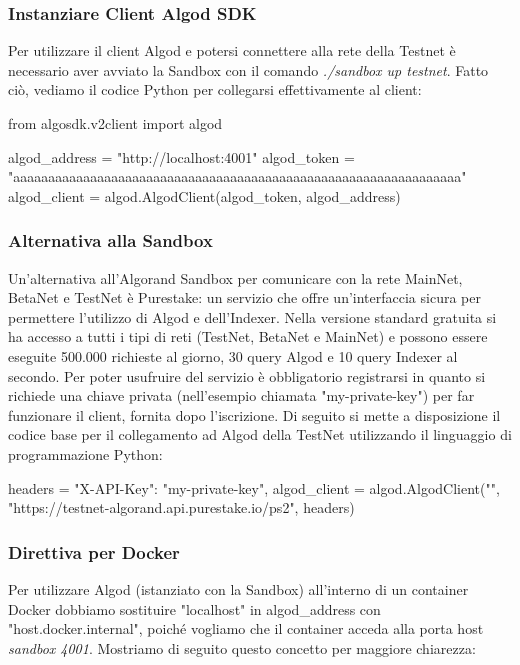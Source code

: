 \subsubsection{Instanziare Client Algod SDK}
Per utilizzare il client Algod e potersi connettere alla rete della Testnet è necessario aver avviato la Sandbox con il comando \textit{./sandbox up testnet}.
Fatto ciò, vediamo il codice Python per collegarsi effettivamente al client:
\begin{pythoncode}
from algosdk.v2client import algod

algod_address = "http://localhost:4001"
algod_token = 
"aaaaaaaaaaaaaaaaaaaaaaaaaaaaaaaaaaaaaaaaaaaaaaaaaaaaaaaaaaaaaaaa"
algod_client = algod.AlgodClient(algod_token, algod_address)
\end{pythoncode}

\subsubsection{Alternativa alla Sandbox}
Un'alternativa all'Algorand Sandbox per comunicare con la rete MainNet, BetaNet e TestNet è Purestake: un servizio che offre un’interfaccia sicura per permettere l'utilizzo di Algod e dell’Indexer. Nella versione standard gratuita si ha accesso a tutti i tipi di reti (TestNet, BetaNet e MainNet) e possono essere eseguite 500.000 richieste al giorno, 30 query Algod e 10 query Indexer al secondo. Per poter usufruire del servizio è obbligatorio registrarsi in quanto si richiede una chiave privata (nell'esempio chiamata "my-private-key") per far funzionare il client, fornita dopo l'iscrizione. Di seguito si mette a disposizione il codice base per il collegamento ad Algod della TestNet utilizzando il linguaggio di programmazione Python:
\begin{pythoncode}
headers = {
"X-API-Key": "my-private-key",
}
algod_client = algod.AlgodClient("",
"https://testnet-algorand.api.purestake.io/ps2", headers)
\end{pythoncode}

\subsubsection{Direttiva per Docker}
Per utilizzare Algod (istanziato con la Sandbox) all'interno di un container Docker dobbiamo sostituire "localhost" in algod\_address con "host.docker.internal", poiché vogliamo che il container acceda alla porta host \textit{sandbox 4001}. Mostriamo di seguito questo concetto per maggiore chiarezza:

